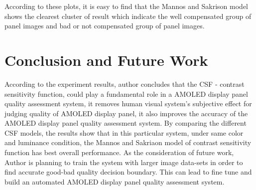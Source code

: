 \documentclass{article}
\begin{document}
According to these plots, it is easy to find that the Mannos and Sakrison model shows the clearest cluster of result which indicate the well compensated group of panel images and bad or not compensated group of panel images.
\section{Conclusion and Future Work}
According to the experiment results, author concludes that the CSF - contrast sensitivity function, could play a fundamental role in a AMOLED display panel quality assessment system, it removes human visual system's subjective effect for judging quality of AMOLED display panel, it also improves the accuracy of the AMOLED display panel quality assessment system. By comparing the different CSF models, the results show that in this particular system, under same color and luminance condition, the Mannos and Sakriaon model of contrast sensitivity function has best overall performance.
As the consideration of future work, Author is planning to train the system with larger image data-sets in order to find accurate good-bad quality decision boundary. This can lead to fine tune and build an automated AMOLED display panel quality assessment system.
\end{document}
